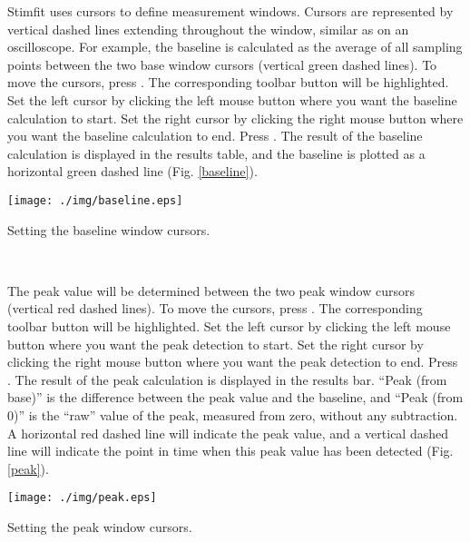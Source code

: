 Stimfit uses cursors to define measurement windows. Cursors are represented by vertical dashed lines extending throughout the window, similar as on an oscilloscope. For example, the baseline is calculated as the average of all sampling points between the two base window cursors (vertical green dashed lines). To move the cursors, press . The corresponding toolbar button will be highlighted. Set the left cursor by clicking the left mouse button where you want the baseline calculation to start. Set the right cursor by clicking the right mouse button where you want the baseline calculation to end. Press . The result of the baseline calculation is displayed in the results table, and the baseline is plotted as a horizontal green dashed line (Fig. \ref{baseline}).
  \begin{myfigure}[ht]
    \begin{center}
      \texttt{[image: ./img/baseline.eps]}
    \end{center}
    \caption{Setting the baseline window cursors.}
    \label{baseline}
  \end{myfigure}
\, \\ \smallskip
{}

The peak value will be determined between the two peak window cursors (vertical red dashed lines).  To move the cursors, press . The corresponding toolbar button will be highlighted. Set the left cursor by clicking the left mouse button where you want the peak detection to start. Set the right cursor by clicking the right mouse button where you want the peak detection to end. Press .  The result of the peak calculation is displayed in the results bar. ``Peak (from base)'' is the difference between the peak value and the baseline, and ``Peak (from 0)'' is the ``raw'' value of the peak, measured from zero, without any subtraction. A horizontal red dashed line will indicate the peak value, and a vertical dashed line will indicate the point in time when this peak value has been detected (Fig. \ref{peak}).
  \begin{myfigure}[ht]
    \begin{center}
      \texttt{[image: ./img/peak.eps]}
    \end{center}
    \caption{Setting the peak window cursors.}
    \label{peak}
  \end{myfigure}


